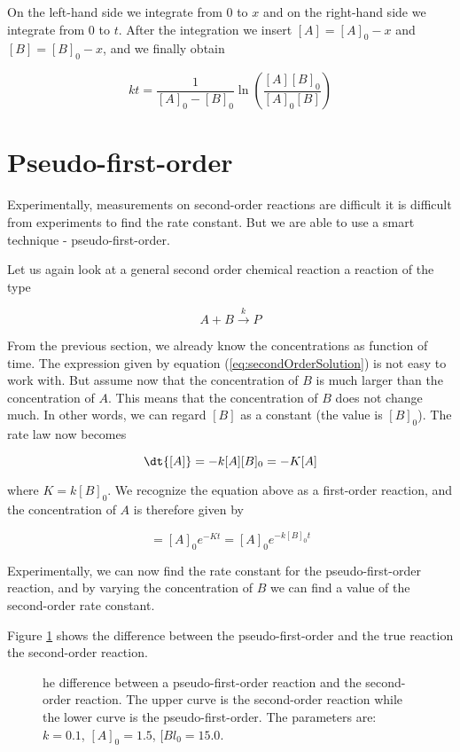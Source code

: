 On the left-hand side we integrate from $0$ to $x$ and on the right-hand side we integrate from $0$ to $t$. After the integration we insert $[A] = [A]_0 - x$ and $[B] = [B]_0 - x$, and we finally obtain

\begin{equation}
  \label{eq:secondOrderSolution}
  kt = \frac{1}{[A]_0 - [B]_0} \ln\left(\frac{[A][B]_0}{[A]_0[B]}\right)
\end{equation}

\section{Pseudo-first-order}
\label{sect:PseudoFirstOrder}

Experimentally, measurements on second-order reactions are difficult \ie it is difficult from experiments to find the rate constant. But we are able to use a smart technique - pseudo-first-order.

Let us again look at a general second order chemical reaction \ie a reaction of the type

\begin{equation}
  A + B \overset{k}{\rightarrow} P
\end{equation}

From the previous section, we already know the concentrations as function of time. The expression given by equation (\ref{eq:secondOrderSolution}) is not easy to work with. But assume now that the concentration of $B$ is much larger than the concentration of $A$. This means that the concentration of $B$ does not change much. In other words, we can regard $[B]$ as a constant (the value is $[B]_0$). The rate law now becomes

\begin{equation}
  \dt{[A]} = -k[A][B]_0 = -K[A]
\end{equation}

where $K = k[B]_0$. We recognize the equation above as a first-order reaction, and the concentration of $A$ is therefore given by

\begin{equation}
  [A] = [A]_0 e^{-Kt} = [A]_0 e^{-k[B]_0t}
\end{equation}

Experimentally, we can now find the rate constant for the pseudo-first-order reaction, and by varying the concentration of $B$ we can find a value of the second-order rate constant.

Figure \ref{fig:PseudoFirstOrder} shows the difference between the pseudo-first-order and the true reaction \ie the second-order reaction.

\begin{figure}
  \caption{he difference between a pseudo-first-order reaction and the second-order reaction. The upper curve is the second-order reaction while the lower curve is the pseudo-first-order. The parameters are: $k = 0.1$, $[A]_0 = 1.5$, $[Bl_0 = 15.0$.}
  \label{fig:PseudoFirstOrder}
\end{figure}